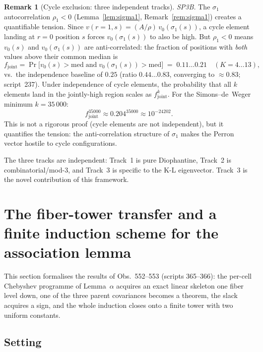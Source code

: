 \documentclass[11pt]{article}
\theoremstyle{definition}
\newtheorem{remark}[theorem]{Remark}
\begin{document}
\begin{remark}[Cycle exclusion: three independent tracks]
\emph{SP3B.} The $\sigma_1$ autocorrelation $\rho_1 < 0$ (Lemma~\ref{lem:sigma1},
Remark~\ref{rem:sigma1}) creates a quantifiable tension.
Since $v(r{=}1,s) = (A/\rho)\,v_0(\sigma_1(s))$, a cycle element landing at
$r=0$ position $s$ forces $v_0(\sigma_1(s))$ to also be high.
But $\rho_1 < 0$ means $v_0(s)$ and $v_0(\sigma_1(s))$ are anti-correlated:
the fraction of positions with \emph{both} values above their common median is
\[
  f_{\mathrm{joint}} = \Pr\bigl[v_0(s) > \mathrm{med}\;\text{and}\;v_0(\sigma_1(s)) > \mathrm{med}\bigr]
  \;=\; 0.11\ldots0.21 \quad (K = 4\ldots 13),
\]
vs.\ the independence baseline of $0.25$ (ratio $0.44\ldots 0.83$,
converging to $\approx 0.83$; script~237).
Under independence of cycle elements, the probability that all $k$ elements
land in the jointly-high region scales as $f_{\mathrm{joint}}^k$.
For the Simons--de~Weger minimum $k = 35\,000$:
\[
  f_{\mathrm{joint}}^{35000} \approx 0.204^{35000} \approx 10^{-24202}.
\]
This is not a rigorous proof (cycle elements are not independent), but it
quantifies the tension: the anti-correlation structure of $\sigma_1$ makes
the Perron vector hostile to cycle configurations.

The three tracks are independent: Track~1 is pure Diophantine, Track~2 is
combinatorial/mod-$3$, and Track~3 is specific to the K-L eigenvector.
Track~3 is the novel contribution of this framework.
\end{remark}


\section{The fiber-tower transfer and a finite induction scheme for the association lemma}
\label{sec:fibertower}

This section formalises the results of Obs.~552--553 (scripts 365--366): the
per-cell Chebyshev programme of Lemma~$\alpha$ acquires an exact linear
skeleton one fiber level down, one of the three parent covariances becomes a
theorem, the slack acquires a sign, and the whole induction closes onto a
finite tower with two uniform constants.

\subsection{Setting}
\end{document}
